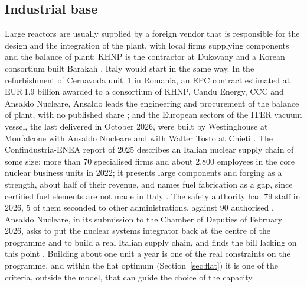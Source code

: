 \subsection{Industrial base}\label{sec:industry}
Large reactors are usually supplied by a foreign vendor that is responsible for the design and the integration of the plant, with local firms supplying components and the balance of plant: KHNP is the contractor at Dukovany \citep{ECDukovany2026} and a Korean consortium built Barakah \citep{WNAuae}. Italy would start in the same way. In the refurbishment of Cernavoda unit~1 in Romania, an EPC contract estimated at EUR\,1.9 billion awarded to a consortium of KHNP, Candu Energy, CCC and Ansaldo Nucleare, Ansaldo leads the engineering and procurement of the balance of plant, with no published share \citep{WNNCernavoda2024}; and the European sectors of the ITER vacuum vessel, the last delivered in October 2026, were built by Westinghouse at Monfalcone with Ansaldo Nucleare and with Walter Tosto at Chieti \citep{WNNITER2026}. The Confindustria-ENEA report of 2025 describes an Italian nuclear supply chain of some size: more than 70 specialised firms and about 2{,}800 employees in the core nuclear business units in 2022; it presents large components and forging as a strength, about half of their revenue, and names fuel fabrication as a gap, since certified fuel elements are not made in Italy \citep{ConfindustriaENEA2025}. The safety authority had 79 staff in 2026, 5 of them seconded to other administrations, against 90 authorised \citep{ISIN2026}. Ansaldo Nucleare, in its submission to the Chamber of Deputies of February 2026, asks to put the nuclear systems integrator back at the centre of the programme and to build a real Italian supply chain, and finds the bill lacking on this point \citep{Ansaldo2026}. Building about one unit a year is one of the real constraints on the programme, and within the flat optimum (Section~\ref{sec:flat}) it is one of the criteria, outside the model, that can guide the choice of the capacity.

